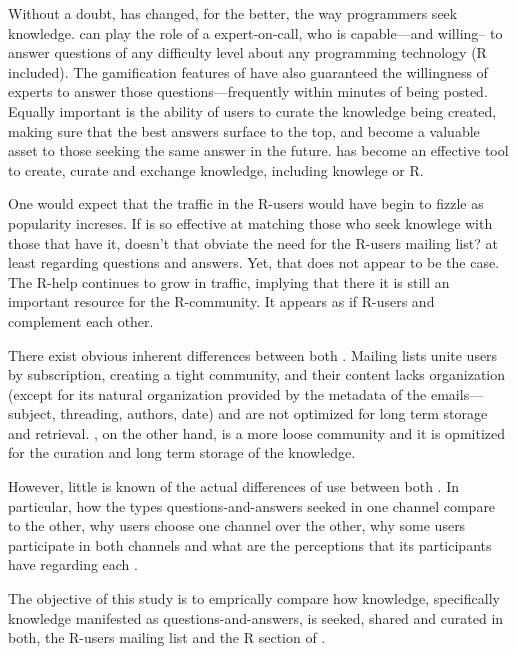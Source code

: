 Without a doubt, \SO has changed, for the better, the way programmers seek knowledge. \SO can play the role of a expert-on-call, who is capable---and willing--
to answer questions of any difficulty level about any programming technology (R included). The gamification features of \SO have also guaranteed the willingness of experts to answer
those questions---frequently within minutes of being posted. Equally important is the ability of \SO users to curate the knowledge being created, making sure that
the best answers surface to the top, and become a valuable asset to those seeking the same answer in the future. \SO has become an effective tool to create, curate and exchange knowledge, including knowlege or R.

One would expect that the traffic in the R-users \ml would have begin to fizzle as \SO popularity increses. If \SO is so effective at matching those who seek
knowlege with those that have it, doesn't that obviate the need for the R-users mailing list? at least regarding questions and answers. Yet, that does not appear
to be the case. The R-help \ml continues to grow in traffic, implying that there it is still an important resource for the R-community. It appears as if R-users
and \SO complement each other.

There exist obvious inherent differences between both \channels. Mailing lists unite users by subscription, creating a tight community, and their content lacks
organization (except for its natural organization provided by the metadata of the emails---subject, threading, authors, date) and are not optimized for long
term storage and retrieval.  \SO, on the other hand, is a more loose community and it is opmitized for the curation and long term storage of the knowledge.

However, little is known of the actual differences of use between both \channels. 
In particular, how the types questions-and-answers seeked in one channel compare to
the other, why users choose one channel over the other, why some users participate in both channels and what are the perceptions that its participants have
regarding each \channel.

The objective of this study is to emprically compare how knowledge, specifically knowledge manifested as questions-and-answers, is seeked, shared and curated in
both, the R-users mailing list and the R section of \SO.




